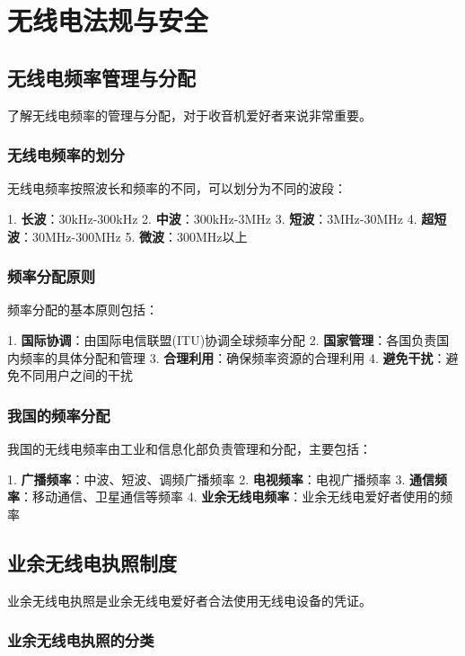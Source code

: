 \documentclass[12pt,UTF8]{ctexbook}
\begin{document}
\part{无线电法规与安全}

\chapter{无线电频率管理与分配}

了解无线电频率的管理与分配，对于收音机爱好者来说非常重要。

\section{无线电频率的划分}

无线电频率按照波长和频率的不同，可以划分为不同的波段：

1. \textbf{长波}：30kHz-300kHz
2. \textbf{中波}：300kHz-3MHz
3. \textbf{短波}：3MHz-30MHz
4. \textbf{超短波}：30MHz-300MHz
5. \textbf{微波}：300MHz以上

\section{频率分配原则}

频率分配的基本原则包括：

1. \textbf{国际协调}：由国际电信联盟(ITU)协调全球频率分配
2. \textbf{国家管理}：各国负责国内频率的具体分配和管理
3. \textbf{合理利用}：确保频率资源的合理利用
4. \textbf{避免干扰}：避免不同用户之间的干扰

\section{我国的频率分配}

我国的无线电频率由工业和信息化部负责管理和分配，主要包括：

1. \textbf{广播频率}：中波、短波、调频广播频率
2. \textbf{电视频率}：电视广播频率
3. \textbf{通信频率}：移动通信、卫星通信等频率
4. \textbf{业余无线电频率}：业余无线电爱好者使用的频率

\chapter{业余无线电执照制度}

业余无线电执照是业余无线电爱好者合法使用无线电设备的凭证。

\section{业余无线电执照的分类}
\end{document}
